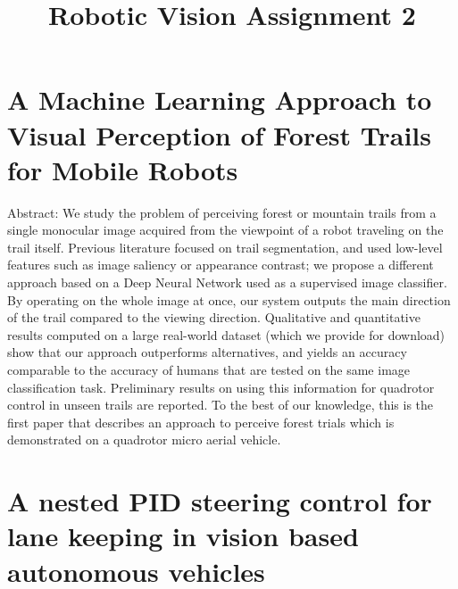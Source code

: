 \documentclass[letterpaper, 10 pt, conference]{ieeeconf}  %
\title{\LARGE \bf
Robotic Vision Assignment 2
}
\begin{document}
\maketitle
\thispagestyle{empty}
\pagestyle{empty}

\section{A Machine Learning Approach to Visual Perception of Forest Trails for Mobile Robots}

Abstract: 
    We study the problem of perceiving forest or mountain trails from a single monocular image acquired from the viewpoint of a robot traveling on the trail itself. Previous literature focused on trail segmentation, and used low-level features such as image saliency or appearance contrast; we propose a different approach based on a Deep Neural Network used as a supervised image classifier. By operating on the whole image at once, our system outputs the main direction of the trail compared to the viewing direction. Qualitative and quantitative results computed on a large real-world dataset (which we provide for download) show that our approach outperforms alternatives, and yields an accuracy comparable to the accuracy of humans that are tested on the same image classification task. Preliminary results on using this information for quadrotor control in unseen trails are reported. To the best of our knowledge, this is the first paper that describes an approach to perceive forest trials which is demonstrated on a quadrotor micro aerial vehicle.\cite{giusti2016machine}


\section{A nested PID steering control for lane keeping in vision based autonomous vehicles}
\end{document}
